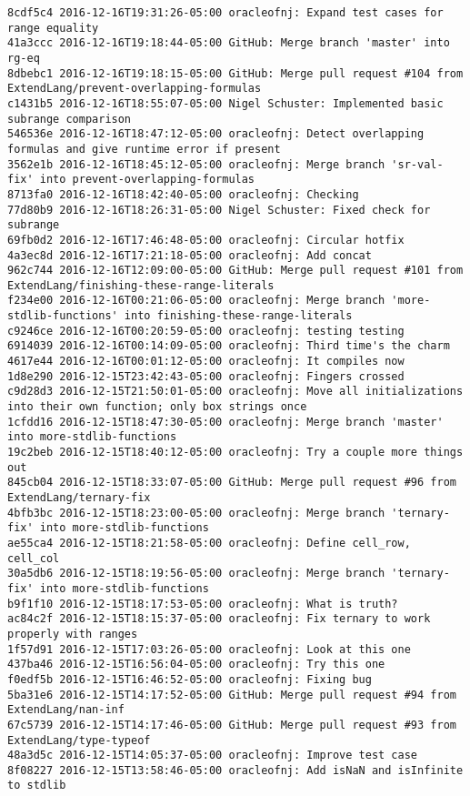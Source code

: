 \begin{lstlisting}
8cdf5c4 2016-12-16T19:31:26-05:00 oracleofnj: Expand test cases for range equality
41a3ccc 2016-12-16T19:18:44-05:00 GitHub: Merge branch 'master' into rg-eq
8dbebc1 2016-12-16T19:18:15-05:00 GitHub: Merge pull request #104 from ExtendLang/prevent-overlapping-formulas
c1431b5 2016-12-16T18:55:07-05:00 Nigel Schuster: Implemented basic subrange comparison
546536e 2016-12-16T18:47:12-05:00 oracleofnj: Detect overlapping formulas and give runtime error if present
3562e1b 2016-12-16T18:45:12-05:00 oracleofnj: Merge branch 'sr-val-fix' into prevent-overlapping-formulas
8713fa0 2016-12-16T18:42:40-05:00 oracleofnj: Checking
77d80b9 2016-12-16T18:26:31-05:00 Nigel Schuster: Fixed check for subrange
69fb0d2 2016-12-16T17:46:48-05:00 oracleofnj: Circular hotfix
4a3ec8d 2016-12-16T17:21:18-05:00 oracleofnj: Add concat
962c744 2016-12-16T12:09:00-05:00 GitHub: Merge pull request #101 from ExtendLang/finishing-these-range-literals
f234e00 2016-12-16T00:21:06-05:00 oracleofnj: Merge branch 'more-stdlib-functions' into finishing-these-range-literals
c9246ce 2016-12-16T00:20:59-05:00 oracleofnj: testing testing
6914039 2016-12-16T00:14:09-05:00 oracleofnj: Third time's the charm
4617e44 2016-12-16T00:01:12-05:00 oracleofnj: It compiles now
1d8e290 2016-12-15T23:42:43-05:00 oracleofnj: Fingers crossed
c9d28d3 2016-12-15T21:50:01-05:00 oracleofnj: Move all initializations into their own function; only box strings once
1cfdd16 2016-12-15T18:47:30-05:00 oracleofnj: Merge branch 'master' into more-stdlib-functions
19c2beb 2016-12-15T18:40:12-05:00 oracleofnj: Try a couple more things out
845cb04 2016-12-15T18:33:07-05:00 GitHub: Merge pull request #96 from ExtendLang/ternary-fix
4bfb3bc 2016-12-15T18:23:00-05:00 oracleofnj: Merge branch 'ternary-fix' into more-stdlib-functions
ae55ca4 2016-12-15T18:21:58-05:00 oracleofnj: Define cell_row, cell_col
30a5db6 2016-12-15T18:19:56-05:00 oracleofnj: Merge branch 'ternary-fix' into more-stdlib-functions
b9f1f10 2016-12-15T18:17:53-05:00 oracleofnj: What is truth?
ac84c2f 2016-12-15T18:15:37-05:00 oracleofnj: Fix ternary to work properly with ranges
1f57d91 2016-12-15T17:03:26-05:00 oracleofnj: Look at this one
437ba46 2016-12-15T16:56:04-05:00 oracleofnj: Try this one
f0edf5b 2016-12-15T16:46:52-05:00 oracleofnj: Fixing bug
5ba31e6 2016-12-15T14:17:52-05:00 GitHub: Merge pull request #94 from ExtendLang/nan-inf
67c5739 2016-12-15T14:17:46-05:00 GitHub: Merge pull request #93 from ExtendLang/type-typeof
48a3d5c 2016-12-15T14:05:37-05:00 oracleofnj: Improve test case
8f08227 2016-12-15T13:58:46-05:00 oracleofnj: Add isNaN and isInfinite to stdlib

\end{lstlisting}
